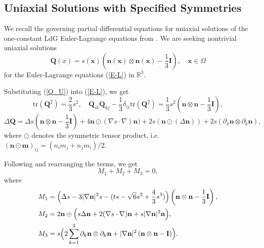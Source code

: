 \documentclass[10pt, a4paper]{article}
\newcommand\n{\mathbf{n}}
\newcommand\m{\mathbf{m}}
\newcommand\x{\mathbf{x}}
\newcommand\Qvec{\mathbf{Q}}
\newcommand\tr{\mathrm{tr}}
\begin{document}
\subsection{Uniaxial Solutions with Specified Symmetries}
\label{sec:uniaxial1}

We recall the governing partial differential equations for uniaxial solutions of the one-constant LdG Euler-Lagrange equations from \cite{lamy2015uniaxial}. 
We are seeking nontrivial  uniaxial solutions 
\begin{equation}\label{Q_U}
\Qvec(x) = s(\x) (\n(\x) \otimes \n(\x) - \frac{1}{3} \mathbf{I}), \quad \x \in \Omega
\end{equation}
for the Euler-Lagrange equations (\ref{E-L}) in $\mathbb{R}^3$. %

Substituting (\ref{Q_U}) into (\ref{E-L}), we get
\begin{equation}
\tr(\Qvec^2) = \frac{2}{3} s^2, \quad  \Qvec_{ik}\Qvec_{kj} - \frac{1}{3} \delta_{ij} \tr(\Qvec^2) = \frac{1}{3} s^2 (\n \otimes \n - \frac{1}{3} {\mathbf{I}}),
\end{equation}
\begin{equation}
\Delta \Qvec = \Delta s (\n \otimes \n - \frac{1}{3} \mathbf{I}) + 4 \n \odot (\nabla s \cdot \nabla) \n) + 2 s (\n \odot (\Delta \n)) + 2 s (\partial_k \n \otimes \partial_k \n),
\end{equation}
where $\odot$ denotes the symmetric tensor product, i.e. $(\n \odot \m)_{ij} = (n_i m_j + n_j m_i) / 2$.

Following \cite{lamy2015uniaxial} and rearranging the terms, we get
\begin{equation}
M_1 + M_2 + M_3 = 0,
\end{equation}
where
\begin{equation}\label{decomp1}
\begin{aligned}
& M_1 = \Bigl( \Delta s - 3 |\nabla \n|^2 s - (ts - \sqrt{6} s^2 + \frac{4}{3} s^3) \Bigr) \left(\n \otimes \n  - \frac{1}{3} \mathbf{I} \right), \\
& M_2 = 2 \n \odot \Bigl( s \Delta \n + 2 (\nabla s \cdot \nabla) \n + s |\nabla \n|^2 \n \Bigr), \\ 
& M_3 = s \Bigl( 2 \sum_{k = 1}^{3}\partial_k \n \otimes \partial_k \n + |\nabla \n|^2 \left( \n \otimes \n - \mathbf{I} \right) \Bigr). \\
\end{aligned}
\end{equation}
\end{document}

